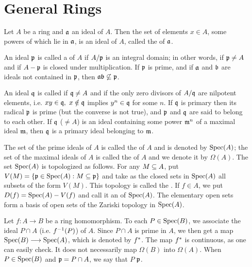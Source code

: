 \documentclass[../main]{subfiles}
\begin{document}
\section{General Rings}\label{sec:01}

\newparagraph
Let $A$ be a ring and $\mathfrak{a}$ an ideal of $A$. Then the set of elements $x\in A$, some powers of which lie in $\mathfrak{a}$, is an ideal of $A$, called the  of $\mathfrak{a}$.

An ideal $\mathfrak{p}$ is called a  of $A$ if $A/\mathfrak{p}$ is an integral domain; in other words, if $\mathfrak{p}\ne A$ and if $A-\mathfrak{p}$ is closed under multiplication. If $\mathfrak{p}$ is prime, and if $\mathfrak{a}$ and $\mathfrak{b}$ are ideals not contained in $\mathfrak{p}$, then $\mathfrak{ab}\not\subseteq\mathfrak{p}$.

An ideal $\mathfrak{q}$ is called  if $\mathfrak{q}\ne A$ and if the only zero divisors of $A/\mathfrak{q}$ are nilpotent elements, i.e. $xy\in\mathfrak{q},~x\notin\mathfrak{q}$ implies $y^n\in\mathfrak{q}$ for some $n$. If $\mathfrak{q}$ is primary then its radical $\mathfrak{p}$ is prime (but the converse is not true), and $\mathfrak{p}$ and $\mathfrak{q}$ are said to belong to each other. If $\mathfrak{q}$ ($\ne A$) is an ideal containing some power $\mathfrak{m}^n$ of a maximal ideal $\mathfrak{m}$, then $\mathfrak{q}$ is a primary ideal belonging to $\mathfrak{m}$.

The set of the prime ideals of $A$ is called the  of $A$ and is denoted by $\operatorname{Spec}(A)$; the set of the maximal ideals of $A$ is called the  of $A$ and we denote it by $\Omega(A)$.\label{sym:maxspec} The set $\operatorname{Spec}(A)$ is topologized as follows. For any $M\subseteq A$, put $V(M) = \left\{\mathfrak{p}\in\operatorname{Spec}(A): M\subseteq\mathfrak{p}\right\}$\label{sym:V} and take as the closed sets in $\operatorname{Spec}(A)$ all subsets of the form $V(M)$. This topology is called the . If $f\in A$, we put $D(f)=\operatorname{Spec}(A)-V(f)$ and call it an  of $\operatorname{Spec}(A)$. The elementary open sets form a basis of open sets of the Zariski topology in $\operatorname{Spec}(A)$.

Let $f:A\longrightarrow B$ be a ring homomorphism. To each $P\in\operatorname{Spec}(B)$, we associate the ideal $P\cap A$ (i.e. $f^{-1}(P)$) of $A$. Since $P\cap A$ is prime in $A$, we then get a map $\operatorname{Spec}(B)\longrightarrow\operatorname{Spec}(A)$, which is denoted by $f^\ast$. The map $f^\ast$ is continuous, as one can easily check. It does not necessarily map $\Omega(B)$ into $\Omega(A)$. When $P\in\operatorname{Spec}(B)$ and $\mathfrak{p}=P\cap A$, we say that $P$  $\mathfrak{p}$.
\end{document}
